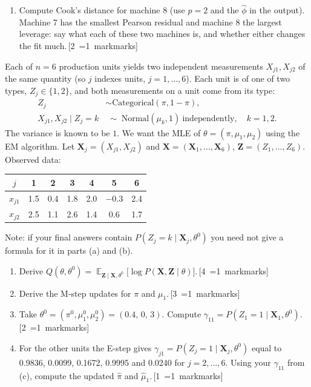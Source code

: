\documentclass[11pt,a4paper]{article}
\newcommand{\mk}[1]{\hfill\hspace*{\fill}\mbox{\,[#1~\ifnum#1=1 mark\else marks\fi]}}
\newcommand{\ans}[1]{\par\nopagebreak[4]\vspace{2pt}\noindent\fbox{\rule{0pt}{#1}\hspace{\dimexpr\linewidth-2\fboxsep-2\fboxrule\relax}}\par\vspace{4pt}}
\newcommand{\qhead}[2]{\Needspace{10\baselineskip}\vspace{10pt}{\large\bfseries Question #1 (#2 marks)}\par\vspace{2pt}}
\newcommand{\R}[1]{\VerbatimInput[fontsize=\footnotesize,frame=single,framesep=2mm,rulecolor=\color{black!50}]{final/r/out/#1}}
\renewcommand{\R}[1]{\VerbatimInput[fontsize=\scriptsize,frame=single,framesep=1.5mm,rulecolor=\color{black!50}]{r/out/#1}}
\DeclareMathOperator{\E}{\mathbb{E}}
\begin{document}
\R{d_q5.txt}

\begin{enumerate}[resume]
\item Compute Cook's distance for machine 8 (use $p=2$ and the $\hat\phi$ in the output). Machine 7 has the smallest Pearson residual and machine 8 the largest leverage: say what each of these two machines is, and whether either changes the fit much.\mk{2}
\ans{6cm}
\end{enumerate}

\clearpage
\qhead{6}{10}
Each of $n=6$ production units yields two independent measurements $X_{j1},X_{j2}$ of the same quantity (so $j$ indexes units, $j=1,\dots,6$). Each unit is of one of two types, $Z_j\in\{1,2\}$, and both measurements on a unit come from its type:
\begin{align*}
Z_j&\sim\text{Categorical}(\pi,1-\pi),\\
X_{j1},X_{j2}\mid Z_j=k&\;\sim\;\text{Normal}(\mu_k,1)\ \text{independently},\quad k=1,2.
\end{align*}
The variance is known to be $1$. We want the MLE of $\theta=(\pi,\mu_1,\mu_2)$ using the EM algorithm. Let $\mathbf X_j=(X_{j1},X_{j2})$ and $\mathbf X=(\mathbf X_1,\dots,\mathbf X_6)$, $\mathbf Z=(Z_1,\dots,Z_6)$. Observed data:

\begin{center}
\begin{tabular}{c|cccccc}
$j$ & 1 & 2 & 3 & 4 & 5 & 6\\\hline
$x_{j1}$ & 1.5 & 0.4 & 1.8 & 2.0 & $-0.3$ & 2.4\\
$x_{j2}$ & 2.5 & 1.1 & 2.6 & 1.4 & 0.6 & 1.7
\end{tabular}
\end{center}
Note: if your final answers contain $P(Z_j=k\mid\mathbf X_j,\theta^0)$ you need not give a formula for it in parts (a) and (b).

\begin{enumerate}
\item Derive $Q(\theta,\theta^0)=\E_{\mathbf Z\mid\mathbf X,\theta^0}\big[\log P(\mathbf X,\mathbf Z\mid\theta)\big]$.\mk{4}
\ans{8cm}
\item Derive the M-step updates for $\pi$ and $\mu_1$.\mk{3}
\ans{6.5cm}
\item Take $\theta^0=(\pi^0,\mu_1^0,\mu_2^0)=(0.4,\,0,\,3)$. Compute $\gamma_{11}=P(Z_1=1\mid\mathbf X_1,\theta^0)$.\mk{2}
\ans{4.5cm}
\item For the other units the E-step gives $\gamma_{j1}=P(Z_j=1\mid\mathbf X_j,\theta^0)$ equal to 0.9836, 0.0099, 0.1672, 0.9995 and 0.0240 for $j=2,\dots,6$. Using your $\gamma_{11}$ from (c), compute the updated $\hat\pi$ and $\hat\mu_1$.\mk{1}
\ans{4.5cm}
\end{enumerate}
\end{document}
